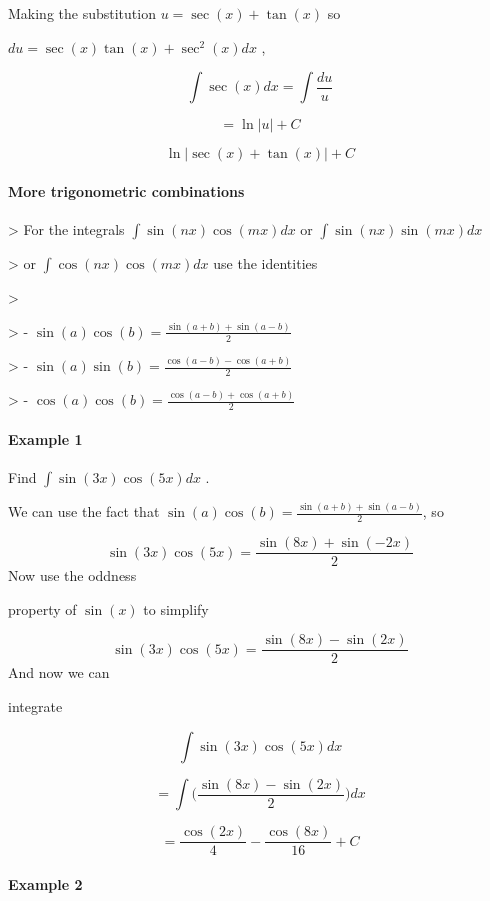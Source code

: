 Making the substitution $u=\sec(x)+\tan(x)$ so

$du=\sec(x)\tan(x)+\sec^2(x)dx$ ,



$$\int\sec(x)dx=\int\frac{du}{u}$$

 $$=\ln|u|+C$$

$$\ln\Big|\sec(x)+\tan(x)\Big|+C$$



\paragraph{More trigonometric combinations}



> For the integrals $\int\sin(nx)\cos(mx)dx$ or $\int\sin(nx)\sin(mx)dx$

> or $\int\cos(nx)\cos(mx)dx$ use the identities

>

> -   $\sin(a)\cos(b)=\frac{\sin(a+b)+\sin(a-b)}{2}$

> -   $\sin(a)\sin(b)=\frac{\cos(a-b)-\cos(a+b)}{2}$

> -   $\cos(a)\cos(b)=\frac{\cos(a-b)+\cos(a+b)}{2}$



\paragraph{Example 1}



Find $\int\sin(3x)\cos(5x)dx$ .



We can use the fact that $\sin(a)\cos(b)=\frac{\sin(a+b)+\sin(a-b)}{2}$, so



$$\sin(3x)\cos(5x)=\frac{\sin(8x)+\sin(-2x)}{2}$$ Now use the oddness

property of $\sin(x)$ to simplify



$$\sin(3x)\cos(5x)=\frac{\sin(8x)-\sin(2x)}{2}$$ And now we can

integrate



$$\int\sin(3x)\cos(5x)dx$$

$$=\int\Big(\frac{\sin(8x)-\sin(2x)}{2}\Big)dx$$

$$=\frac{\cos(2x)}{4}-\frac{\cos(8x)}{16}+C$$



\paragraph{Example 2}



